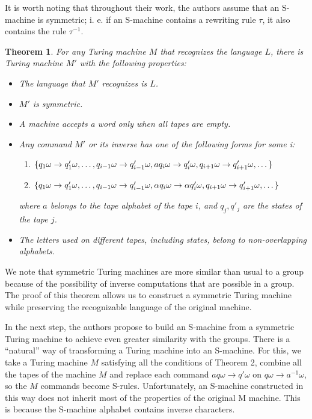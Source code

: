 \documentclass[conference]{IEEEtran}
\newtheorem{thm}{Theorem}[section]
\theoremstyle{definition}
\begin{document}
It is worth noting that throughout their work, the authors assume that 
an S-machine is symmetric; i. e. if an S-machine contains 
a rewriting rule $\tau$, it also contains the rule $\tau^{-1}$.

\begin{thm} \label{thmTM}
For any Turing machine $ M $ that recognizes the language $ L $, there is
Turing machine $ M' $ with the following properties:
\begin{itemize}
\item The language that $ M'$ recognizes is $ L $.
\item $ M'$ is symmetric.
\item A machine accepts a word only when all tapes are empty.
\item Any command $ M' $ or its inverse has one of the following forms for some i:
\begin{enumerate}
\item $\{ q_1 \omega \to q'_1 \omega, \dots, q_{i-1} \omega \to q'_{i-1} \omega, \\
a q_i \omega \to q'_i \omega, q_{i+1} \omega \to q'_{i+1} \omega, \dots \}$
\item $\{q_1 \omega \to q'_1 \omega, \dots, q_{i-1} \omega \to q'_{i-1} \omega, \\
\alpha q_i \omega \to \alpha q'_i \omega, q_{i+1} \omega \to q'_{i+1} \omega, \dots \} $
\end{enumerate}
where $a$ belongs to the tape alphabet of the tape $i$, and $q_j, q'_j$ are the 
states of the tape $j$.
\item The letters used on different tapes, including states, belong to non-overlapping alphabets.
\end{itemize}
\end{thm}

We note that symmetric Turing machines are more similar than usual to a group 
because of the possibility of inverse computations that are possible in a group. 
The proof of this theorem allows us to construct a symmetric Turing machine 
while preserving the recognizable language of the original machine.

In the next step, the authors propose to build an S-machine from a symmetric 
Turing machine to achieve even greater similarity with the groups. 
There is a “natural” way of transforming a Turing machine into an S-machine. 
For this, we take a Turing machine $ M $ satisfying all the conditions of Theorem 2,
combine all the tapes of the machine $ M $ and replace each command 
$a q \omega \to q' \omega$
on $q \omega \to a^{- 1} \omega$, so the $ M $ commands become S-rules.
Unfortunately, an S-machine constructed in this way does not inherit most 
of the properties of the original M machine. This is because the S-machine 
alphabet contains inverse characters.
\end{document}
